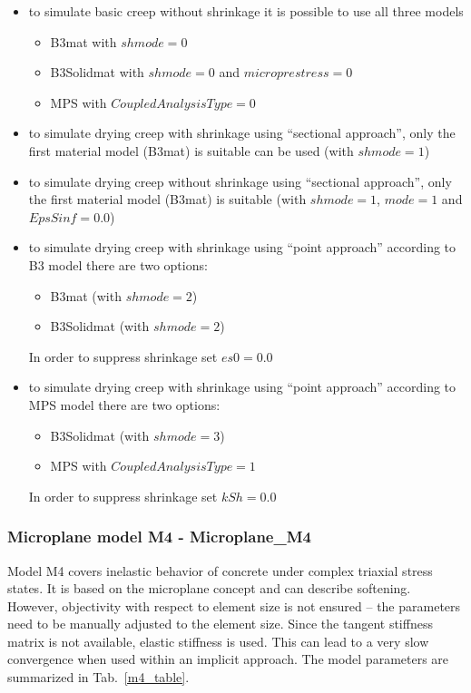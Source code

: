 \documentclass[a4paper]{article}
\begin{document}
\begin {itemize}
\item to simulate basic creep without shrinkage it is possible to use
  all three models
\begin {itemize}%
\item B3mat with $shmode = 0$
\item B3Solidmat with $shmode = 0$ and $microprestress = 0$
\item MPS with $CoupledAnalysisType = 0$
\end{itemize}
\item to simulate drying creep with shrinkage using ``sectional approach'', only the
  first material model (B3mat) is suitable can be used (with $shmode = 1$)

\item to simulate drying creep without shrinkage using ``sectional approach'', only the
  first material model (B3mat) is suitable (with $shmode = 1$, $mode = 1$
  and $EpsSinf = 0.0$)

\item to simulate drying creep with shrinkage using ``point approach''
  according to B3 model there are two options:
\begin {itemize} %
\item B3mat (with $shmode = 2$)
\item B3Solidmat (with $shmode = 2$)
\end{itemize}
In order to suppress shrinkage set $es0 = 0.0$

\item to simulate drying creep with shrinkage using ``point approach''
  according to MPS model there are two options:
\begin {itemize} %
\item B3Solidmat (with $shmode = 3$)
\item MPS with $CoupledAnalysisType = 1$
\end{itemize}
In order to suppress shrinkage set $kSh = 0.0$
\end{itemize}


\clearpage


\subsubsection{Microplane model M4 - Microplane\_M4}
Model M4 covers inelastic behavior of concrete under complex
triaxial stress states. It is based on the microplane concept and
can describe softening. However, 
objectivity with respect
to element size is not ensured -- the parameters need to be manually adjusted
to the element size. Since the tangent stiffness matrix is not available, 
elastic stiffness is used. This can lead to a very slow convergence 
when used within an implicit approach.
The model parameters are summarized
in Tab.~\ref{m4_table}.
\end{document}
